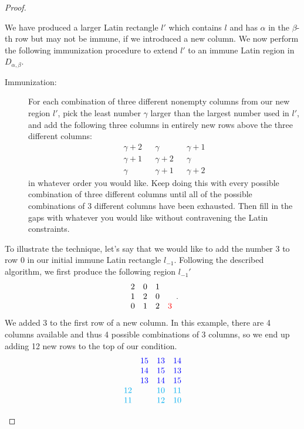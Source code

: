 \documentclass[12pt,a4paper]{article}
\begin{document}
\begin{proof}
\begin{enumerate}
	We have produced a larger Latin rectangle $l'$ which contains $l$ and has $\alpha$ in the $\beta$-th row but may not be immune, if we introduced a new column. We now perform the following immunization procedure to extend $l'$ to an immune Latin region in $D_{\alpha,\beta}$.
\begin{description}
		\item[Immunization:] For each combination of three different nonempty columns from our new region $l'$, pick the least number $\gamma$ larger than the largest number used in $l'$, and add the following three columns in entirely new rows above the three different columns: 
				$$\begin{array}{ccccc}
			\gamma+2  && \gamma   &&  \gamma+1 \\ 
			\gamma+1  && \gamma+2 &&  \gamma \\
			\gamma  && \gamma+1 && \gamma+2
		\end{array}$$ in whatever order you would like. Keep doing this with every possible combination of three different columns until all of the possible combinations of 3 different columns have been exhausted. Then fill in the gaps with whatever you would like without contravening the Latin constraints. %
		\end{description}
		To illustrate the technique, let's say that we would like to add the number $3$ to row $0$ in our initial immune Latin rectangle $l_{-1}$. Following the described algorithm, we first produce
		the following region $l_{-1}'$ 
		$$\begin{array}{cccc}
			2  & 0   &  1 &  \\ 
			1 & 2 &  0  &\\
			 0  & 1 & 2 & \color{red} 3
		\end{array}.$$
		We added 3 to the first row of a new column. In this example, there are 4 columns available and thus 4 possible combinations of 3 columns, so we end up adding 12 new rows to the top of our condition.		
		$$\begin{array}{cccc}
						&\color{blue}15& \color{blue}13&\color{blue}14\\
						&\color{blue}14&\color{blue}15&\color{blue}13\\
						&\color{blue}13&\color{blue}14&\color{blue}15\\
						\color{cyan}12&&\color{cyan}10&\color{cyan}11\\
						\color{cyan}11&&\color{cyan}12&\color{cyan}10\\

\end{array}$$
\end{enumerate}
\end{proof}
\end{document}
